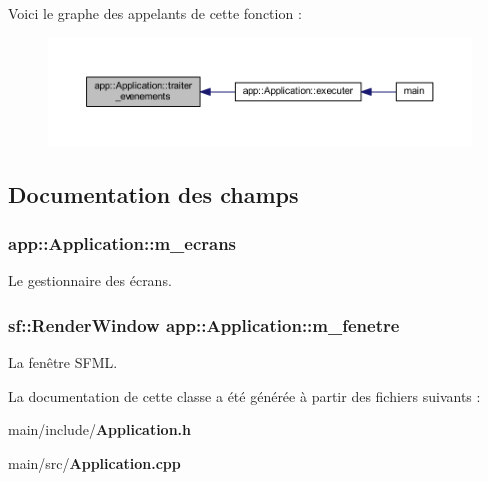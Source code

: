 Voici le graphe des appelants de cette fonction \+:\nopagebreak
\begin{figure}[H]
\begin{center}
\leavevmode
\includegraphics[width=350pt]{classapp_1_1_application_aee4bdeeb44c6b2a943acc8e651b0ff83_icgraph}
\end{center}
\end{figure}




\subsection{Documentation des champs}
\subsubsection[{m\+\_\+ecrans}]{ app\+::\+Application\+::m\+\_\+ecrans\hspace{0.3cm}{\ttfamily [private]}}\label{classapp_1_1_application_ae619078005ea4200ea4db019c0f6d8de}


Le gestionnaire des écrans. 

\subsubsection[{m\+\_\+fenetre}]{\setlength{\rightskip}{0pt plus 5cm}sf\+::\+Render\+Window app\+::\+Application\+::m\+\_\+fenetre\hspace{0.3cm}{\ttfamily [private]}}\label{classapp_1_1_application_a2b45d94b25a7b29cb7409b7701c3c2d5}


La fenêtre S\+F\+M\+L. 



La documentation de cette classe a été générée à partir des fichiers suivants \+:\begin{DoxyCompactItemize}
\item 
main/include/{\bf Application.\+h}\item 
main/src/{\bf Application.\+cpp}\end{DoxyCompactItemize}
